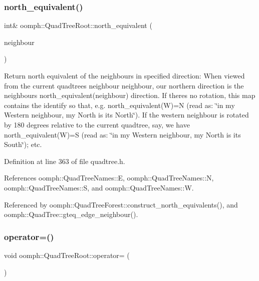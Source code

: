 \subsubsection{\texorpdfstring{north\+\_\+equivalent()}{north\_equivalent()}}
{\footnotesize\ttfamily int\& oomph\+::\+Quad\+Tree\+Root\+::north\+\_\+equivalent (\begin{DoxyParamCaption}\item[{const int \&}]{neighbour }\end{DoxyParamCaption})\hspace{0.3cm}{\ttfamily [inline]}}



Return north equivalent of the neighbours in specified direction\+: When viewed from the current quadtree\textquotesingle{}s {\ttfamily neighbour} neighbour, our northern direction is the neighbour\textquotesingle{}s north\+\_\+equivalent(neighbour) direction. If there\textquotesingle{}s no rotation, this map contains the identify so that, e.\+g. {\ttfamily north\+\_\+equivalent(\+W)=N} (read as\+: \char`\"{}in my Western
neighbour, my North is its North\char`\"{}). If the western neighbour is rotated by 180 degrees relative to the current quadtree, say, we have {\ttfamily north\+\_\+equivalent(\+W)=S} (read as\+: \char`\"{}in my Western
neighbour, my North is its South\char`\"{}); etc. 



Definition at line 363 of file quadtree.\+h.



References oomph\+::\+Quad\+Tree\+Names\+::E, oomph\+::\+Quad\+Tree\+Names\+::N, oomph\+::\+Quad\+Tree\+Names\+::S, and oomph\+::\+Quad\+Tree\+Names\+::W.



Referenced by oomph\+::\+Quad\+Tree\+Forest\+::construct\+\_\+north\+\_\+equivalents(), and oomph\+::\+Quad\+Tree\+::gteq\+\_\+edge\+\_\+neighbour().

\mbox{\label{classoomph_1_1QuadTreeRoot_afbf242b23375516d29a087417bb1bf30}} 
\subsubsection{\texorpdfstring{operator=()}{operator=()}}
{\footnotesize\ttfamily void oomph\+::\+Quad\+Tree\+Root\+::operator= (\begin{DoxyParamCaption}\item[{const \hyperlink{classoomph_1_1QuadTreeRoot}{Quad\+Tree\+Root} \&}]{ }\end{DoxyParamCaption})\hspace{0.3cm}{\ttfamily [inline]}}



